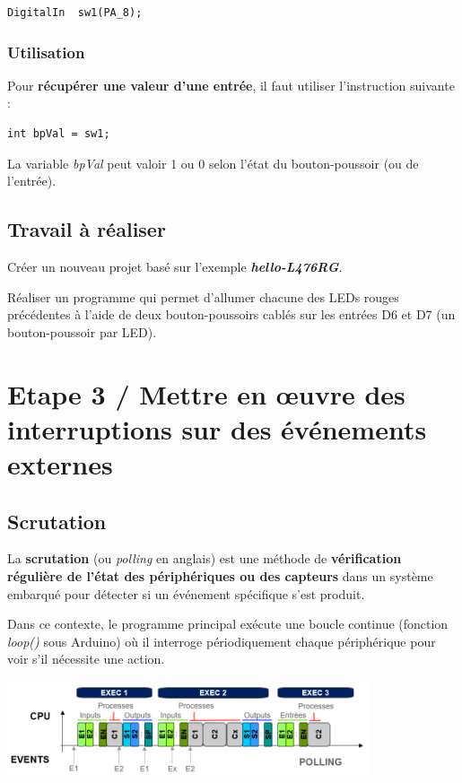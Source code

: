 \documentclass[a4paper,11pt,titlepage]{article} %
\begin{document}
\begin{lstlisting}
DigitalIn  sw1(PA_8);
\end{lstlisting}

\subsubsection{Utilisation}

Pour \textbf{récupérer une valeur d'une entrée}, il faut utiliser l'instruction suivante :

\begin{lstlisting}
int bpVal = sw1;
\end{lstlisting}

La variable \textsl{bpVal} peut valoir \textsc{1} ou \textsc{0} selon l'état du bouton-poussoir (ou de l'entrée).

\subsection{Travail à réaliser}

\Manip Créer un nouveau projet basé sur l'exemple \textbf{\textsl{hello-L476RG}}.

\Manip Réaliser un programme qui permet d'allumer chacune des LEDs rouges précédentes à l'aide de deux bouton-poussoirs cablés sur les entrées D6 et D7 (un bouton-poussoir par LED).


\newpage
\section{Etape 3 / Mettre en \oe{}uvre des interruptions sur des événements externes}

\subsection{Scrutation}

La \textbf{scrutation} (ou \textit{polling} en anglais) est une méthode de \textbf{vérification régulière de l'état des périphériques ou des capteurs} dans un système embarqué pour détecter si un événement spécifique s'est produit. 

Dans ce contexte, le programme principal exécute une boucle continue (fonction \textsl{loop()} sous Arduino) où il interroge périodiquement chaque périphérique pour voir s'il nécessite une action. 

\begin{center}
	\includegraphics[width=0.8\textwidth]{images/gen_polling.png}
\end{center}
\end{document}
